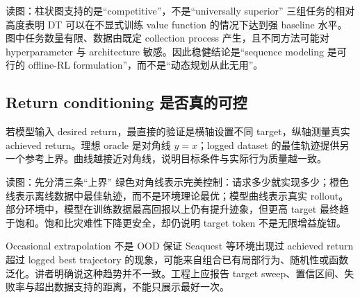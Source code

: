 \begin{knowledgebox}{读图：柱状图支持的是“competitive”，不是“universally superior”}
三组任务的相对高度表明 DT 可以在不显式训练 value function 的情况下达到强 baseline 水平。图中任务数量有限、数据由既定 collection process 产生，且不同方法可能对 hyperparameter 与 architecture 敏感。因此稳健结论是“sequence modeling 是可行的 offline-RL formulation”，而不是“动态规划从此无用”。
\end{knowledgebox}


\subsection{Return conditioning 是否真的可控}

若模型输入 desired return，最直接的验证是横轴设置不同 target，纵轴测量真实 achieved return。理想 oracle 是对角线 $y=x$；logged dataset 的最佳轨迹提供另一个参考上界。曲线越接近对角线，说明目标条件与实际行为质量越一致。


\begin{knowledgebox}{读图：先分清三条“上界”}
绿色对角线表示完美控制：请求多少就实现多少；橙色线表示离线数据中最佳轨迹，而不是环境理论最优；模型曲线表示真实 rollout。部分环境中，模型在训练数据最高回报以上仍有提升迹象，但更高 target 最终趋于饱和。饱和比灾难性下降更安全，却仍说明 target token 不是无限增益旋钮。
\end{knowledgebox}

\begin{warningbox}{Occasional extrapolation 不是 OOD 保证}
Seaquest 等环境出现过 achieved return 超过 logged best trajectory 的现象，可能来自组合已有局部行为、随机性或函数泛化。讲者明确说这种趋势并不一致。工程上应报告 target sweep、置信区间、失败率与超出数据支持的距离，不能只展示最好一次。
\end{warningbox}


